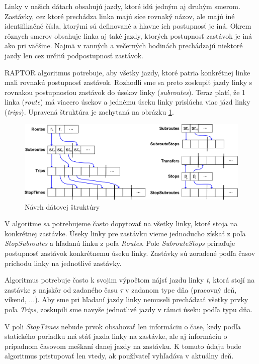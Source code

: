 Linky v našich dátach obsahujú jazdy, ktoré idú jedným aj druhým smerom. Zastávky, cez ktoré prechádza linka majú síce rovnaký názov, ale majú iné identifikačné čísla, ktorými sú definované a hlavne ich postupnosť je iná. Okrem rôznych smerov obsahuje linka aj také jazdy, ktorých postupnosť zastávok je iná ako pri väčšine. Najmä v ranných a večerných hodinách prechádzajú niektoré jazdy len cez určitú podpostupnosť zastávok. 

RAPTOR algoritmus potrebuje, aby všetky jazdy, ktoré patria konkrétnej linke mali rovnakú postupnosť zastávok. Rozhodli sme sa preto zoskupiť jazdy linky s rovnakou postupnosťou zastávok do úsekov linky (\textit{subroutes}). Teraz platí, že 1 linka (\textit{route}) má viacero úsekov a jednému úseku linky prislúcha viac jázd linky (\textit{trips}). Upravená štruktúra je zachytaná na obrázku \ref{fig:my-datastructure}.

\begin{figure}[H]
\centerline{\includegraphics[width=1.0\textwidth]{images/my-structure}}
\caption[Návrh dátovej štruktúry]{Návrh dátovej štruktúry}
\label{fig:my-datastructure}
\end{figure}

V algoritme sa potrebujeme často dopytovať na všetky linky, ktoré stoja na konkrétnej zastávke. Úseky linky pre zastávku vieme jednoducho získať z poľa \textit{StopSubroutes} a hľadanú linku z poľa \textit{Routes}. Pole \textit{SubrouteStops} priraďuje postupnosť zastávok konkrétnemu úseku linky. Zastávky sú zoradené podľa časov príchodu linky na jednotlivé zastávky.

Algoritmus potrebuje často k svojim výpočtom nájsť jazdu linky \textit{t}, ktorá stojí na zastávke \textit{p} najskôr od zadaného času $\tau$ v zadanom type dňa (pracovný deň, víkend, ...). 
Aby sme pri hľadaní jazdy linky nemuseli prechádzať všetky prvky poľa \textit{Trips}, zoskupili sme navyše jednotlivé jazdy v rámci úseku podľa typu dňa.

V poli \textit{StopTimes} nebude prvok obsahovať len informáciu o čase, kedy podľa statického poriadku má stáť jazda linky na zastávke, ale aj informáciu o prípadnom časovom meškaní danej jazdy na zastávku. K tomuto údaju bude algoritmus pristupovať len vtedy, ak používateľ vyhľadáva v aktuálny deň. 

